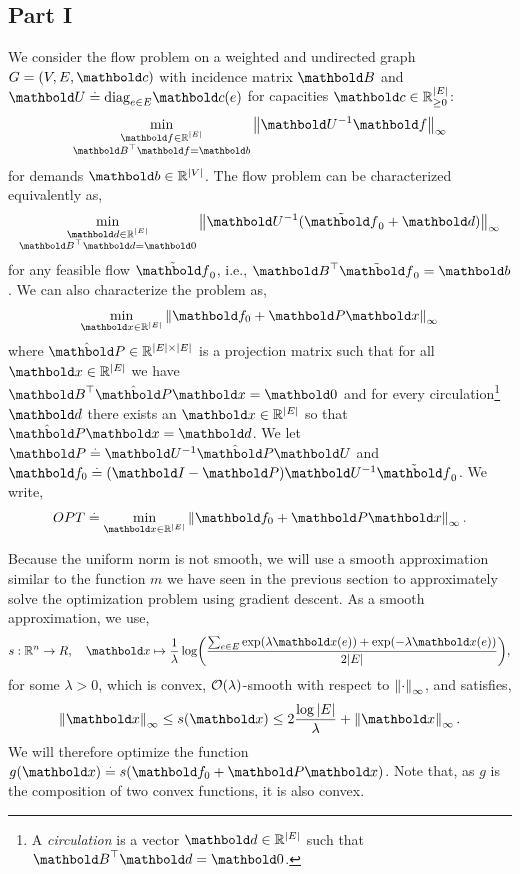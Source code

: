 \documentclass{tufte-handout}
\begin{document}
\subsection{Part I}
We consider the flow problem on a weighted and undirected graph $G = (V, E, \vc)$ with incidence matrix $\mB$ and $\mU \defeq \diag_{e \in E} \vc(e)$ for capacities $\vc \in \R_{\geq 0}^{|E|}$: \begin{align*}
    \min_{\substack{\vf\in\R^{|E|} \\ \trans{\mB}\vf = \vb}} \norm{\mU^{-1}\vf}_\infty
\end{align*} for demands $\vb \in \R^{|V|}$. The flow problem can be characterized equivalently as, \begin{align*}
    \min_{\substack{\vd\in\R^{|E|} \\ \trans{\mB}\vd = \vZero}} \norm{\mU^{-1}(\Tilde{\vf}_0 + \vd)}_\infty
\end{align*} for any feasible flow $\Tilde{\vf}_0$, i.e., $\trans{\mB}\Tilde{\vf}_0 = \vb$. We can also characterize the problem as, \begin{align*}
    \min_{\vx\in\R^{|E|}} \norm{\vf_0 + \mP\vx}_\infty
\end{align*} where $\hat{\mP} \in \R^{|E|\times|E|}$ is a projection matrix such that for all $\vx \in \R^{|E|}$ we have $\trans{\mB}\hat{\mP}\vx = \vZero$ and for every circulation\footnote{A \emph{circulation} is a vector $\vd \in \R^{|E|}$ such that $\trans{\mB}\vd = \vZero$.} $\vd$ there exists an $\vx \in \R^{|E|}$ so that $\hat{\mP}\vx = \vd$. We let $\mP \defeq \mU^{-1} \hat{\mP} \mU$ and $\vf_0 \defeq (\mI - \mP)\mU^{-1}\Tilde{\vf}_0$. We write, \begin{align*}
    OPT \defeq \min_{\vx\in\R^{|E|}} \norm{\vf_0 + \mP\vx}_\infty.
\end{align*}

Because the uniform norm is not smooth, we will use a smooth approximation similar to the function $m$ we have seen in the previous section to approximately solve the optimization problem using gradient descent. As a smooth approximation, we use, \begin{align*}
    s : \R^n \to R,\quad \vx \mapsto \frac{1}{\lambda}\log\parentheses*{\frac{\sum_{e \in E} \exp(\lambda \vx(e)) + \exp(-\lambda \vx(e))}{2|E|}},
\end{align*} for some $\lambda > 0$, which is convex, $\LandauO{\lambda}$-smooth with respect to $\left\| \cdot \right\|_\infty$, and satisfies, \begin{align}
    \norm{\vx}_\infty \leq s(\vx) \leq 2\frac{\log |E|}{\lambda} + \norm{\vx}_\infty.
\end{align} We will therefore optimize the function $g(\vx) \defeq s(\vf_0 + \mP\vx)$. Note that, as $g$ is the composition of two convex functions, it is also convex.
\end{document}
